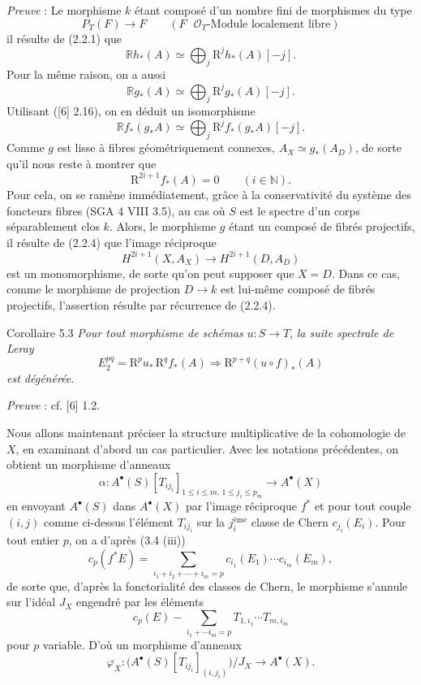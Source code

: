 \emph{Preuve} : Le morphisme $k$ étant composé d'un nombre fini de morphismes du type
\[
P_T(F)\to F\qquad (F\text{ }\mathcal{O}_T\text{-Module localement libre})
\tag{Q}
\]
il résulte de (2.2.1) que
\[
\mathbb{R} h_*(A)\simeq\bigoplus_j \mathrm{R}^jh_*(A)[-j].
\]
Pour la même raison, on a aussi
\[
\mathbb{R} g_*(A)\simeq\bigoplus_j \mathrm{R}^jg_*(A)[-j].
\]
Utilisant ([6] 2.16), on en déduit un isomorphisme
\[
\mathbb{R} f_*(g_*A)\simeq\bigoplus_j \mathrm{R}^j f_*(g_*A)[-j].
\]
Comme $g$ est lisse à fibres géométriquement connexes, $A_X\simeq g_*(A_D)$, de sorte qu'il nous reste à montrer que
\[
\mathrm{R}^{2i+1}f_*(A)=0\qquad (i\in\mathbb{N}).
\tag{5.2.1}
\]
Pour cela, on se ramène immédiatement, grâce à la conservativité du système des foncteurs fibres (SGA 4 VIII 3.5), au cas où $S$ est le spectre d'un corps séparablement clos $k$. Alors, le morphisme $g$ étant un composé de fibrés projectifs, il résulte de (2.2.4) que l'image réciproque
\[
H^{2i+1}(X,A_X)\to H^{2i+1}(D,A_D)
\]
est un monomorphisme, de sorte qu'on peut supposer que $X=D$. Dans ce cas, comme le
morphisme de projection $D\to k$ est lui-même composé de fibrés projectifs, l'assertion résulte par récurrence de (2.2.4).

\begin{statement}{Corollaire 5.3}
\emph{Pour tout morphisme de schémas} $u:S\to T$, \emph{la suite spectrale de Leray}
\[
E_2^{pq}=\mathrm{R}^p u_*\,\mathrm{R}^q f_*(A)\Rightarrow \mathrm{R}^{p+q}(u\circ f)_*(A)
\]
\emph{est dégénérée}.
\end{statement}

\emph{Preuve} : cf. [6] 1.2.

Nous allons maintenant préciser la structure multiplicative de la cohomologie de $X$, en examinant d'abord un cas particulier. Avec les notations précédentes, on obtient un morphisme d'anneaux
\[
\alpha:A^{\bullet}(S)[T_{ij_i}]_{1\le i\le m,\,1\le j_i\le p_m}\to A^{\bullet}(X)
\]
en envoyant $A^{\bullet}(S)$ dans $A^{\bullet}(X)$ par l'image réciproque $f^*$ et pour tout couple $(i,j)$ comme ci-dessus l'élément $T_{ij_i}$ sur la $j_i^{\text{ème}}$ classe de Chern $c_{j_i}(E_i)$. Pour tout entier $p$, on a d'après (3.4 (iii))
\[
c_p(f^*E)=\sum_{i_1+i_2+\cdots+i_m=p}c_{i_1}(E_1)\cdots c_{i_m}(E_m),
\]
de sorte que, d'après la fonctorialité des classes de Chern, le morphisme s'annule sur l'idéal $J_X$ engendré par les éléments
\[
c_p(E)-\sum_{i_1+\cdots i_m=p}T_{1,i_1}\cdots T_{m,i_m}
\]
pour $p$ variable. D'où un morphisme d'anneaux
\[
\varphi_X:\bigl(A^{\bullet}(S)[T_{ij_i}]_{(i,j_i)}\bigr)/J_X\to A^{\bullet}(X).
\]

